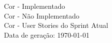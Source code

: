 \begin{landscape}
		Cor - Implementado \\
		Cor - Não Implementado \\
		Cor - User Stories do Sprint Atual \\
		Data de geração: \today
		

\end{landscape}
